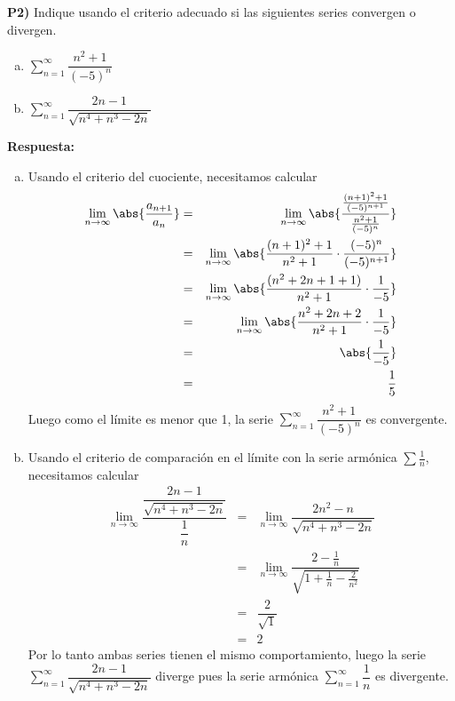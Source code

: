 \documentclass{article}
\begin{document}
\newpage
\noindent\textbf{P2) } Indique usando el criterio adecuado si las siguientes series convergen o divergen.
\begin{enumerate}[a)]
  \item $\displaystyle\sum_{n=1}^{\infty}\dfrac{n^2+1}{(-5)^n}$
  \item $\displaystyle\sum_{n=1}^{\infty}\dfrac{2n-1}{\sqrt{n^4+n^3-2n}}$
\end{enumerate}

\vspace{0.25cm}
\noindent\textbf{Respuesta:} 
\begin{enumerate}[a)]
  \item Usando el criterio del cuociente, necesitamos calcular
    \begin{eqnarray*}
      \lim_{n\to\infty}\abs{\dfrac{a_{n+1}}{a_n}} 
        &=& \lim_{n\to\infty}\abs{\dfrac{\frac{(n+1)^2+1}{(-5)^{n+1}}}{\frac{n^2+1}{(-5)^n}}}\\
        &=& \lim_{n\to\infty}\abs{\dfrac{(n+1)^2+1}{n^2+1}\cdot\dfrac{(-5)^n}{(-5)^{n+1}}}\\
        &=& \lim_{n\to\infty}\abs{\dfrac{(n^2+2n+1+1)}{n^2+1}\cdot\dfrac{1}{-5}}\\
        &=& \lim_{n\to\infty}\abs{\dfrac{n^2+2n+2}{n^2+1}\cdot\dfrac{1}{-5}}\\
        &=& \abs{\dfrac{1}{-5}}\\
        &=& \dfrac{1}{5}
    \end{eqnarray*}
    Luego como el límite es menor que 1, la serie $\displaystyle\sum_{n=1}^{\infty}\dfrac{n^2+1}{(-5)^n}$ es convergente.

  \item Usando el criterio de comparación en el límite con la serie armónica $\sum\frac{1}{n}$, necesitamos calcular
    \begin{eqnarray*}
      \lim_{n\to\infty}\dfrac{\dfrac{2n-1}{\sqrt{n^4+n^3-2n}}}{\dfrac{1}{n}} 
        &=& \lim_{n\to\infty}\dfrac{2n^2-n}{\sqrt{n^4+n^3-2n}}\\
        &=& \lim_{n\to\infty}\dfrac{2-\frac{1}{n}}{\sqrt{1+\frac{1}{n}-\frac{2}{n^2}}}\\
        &=& \dfrac{2}{\sqrt{1}}\\
        &=& 2
    \end{eqnarray*}
    Por lo tanto ambas series tienen el mismo comportamiento, luego la serie $\displaystyle\sum_{n=1}^{\infty}\dfrac{2n-1}{\sqrt{n^4+n^3-2n}}$ diverge pues la serie armónica $\displaystyle\sum_{n=1}^{\infty}\dfrac{1}{n}$ es divergente.
\end{enumerate}
\end{document}
